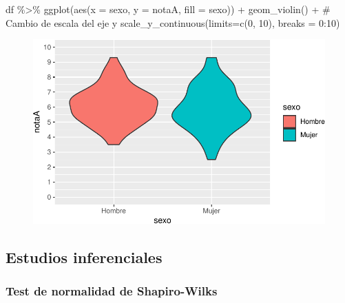 \documentclass[
  a4paper,
]{scrreport}
\newenvironment{Shaded}{\begin{snugshade}}{\end{snugshade}}
\newcommand{\AttributeTok}[1]{\textcolor[rgb]{0.40,0.45,0.13}{#1}}
\newcommand{\CommentTok}[1]{\textcolor[rgb]{0.37,0.37,0.37}{#1}}
\newcommand{\DecValTok}[1]{\textcolor[rgb]{0.68,0.00,0.00}{#1}}
\newcommand{\FunctionTok}[1]{\textcolor[rgb]{0.28,0.35,0.67}{#1}}
\newcommand{\NormalTok}[1]{\textcolor[rgb]{0.00,0.23,0.31}{#1}}
\newcommand{\SpecialCharTok}[1]{\textcolor[rgb]{0.37,0.37,0.37}{#1}}
\theoremstyle{definition}
\theoremstyle{definition}
\theoremstyle{remark}
\begin{document}
\begin{Shaded}
\begin{Highlighting}[]
\NormalTok{df }\SpecialCharTok{\%\textgreater{}\%} \FunctionTok{ggplot}\NormalTok{(}\FunctionTok{aes}\NormalTok{(}\AttributeTok{x =}\NormalTok{ sexo, }\AttributeTok{y =}\NormalTok{ notaA, }\AttributeTok{fill =}\NormalTok{ sexo)) }\SpecialCharTok{+} 
  \FunctionTok{geom\_violin}\NormalTok{() }\SpecialCharTok{+}
  \CommentTok{\# Cambio de escala del eje y}
  \FunctionTok{scale\_y\_continuous}\NormalTok{(}\AttributeTok{limits=}\FunctionTok{c}\NormalTok{(}\DecValTok{0}\NormalTok{, }\DecValTok{10}\NormalTok{), }\AttributeTok{breaks =} \DecValTok{0}\SpecialCharTok{:}\DecValTok{10}\NormalTok{)}
\end{Highlighting}
\end{Shaded}

\begin{figure}[H]

{\centering \includegraphics{08-analisis-estadisticos_files/figure-pdf/unnamed-chunk-29-1.pdf}

}

\end{figure}

\hypertarget{estudios-inferenciales-2}{%
\subsection{Estudios inferenciales}\label{estudios-inferenciales-2}}

\hypertarget{test-de-normalidad-de-shapiro-wilks}{%
\subsubsection{Test de normalidad de
Shapiro-Wilks}\label{test-de-normalidad-de-shapiro-wilks}}
\end{document}

